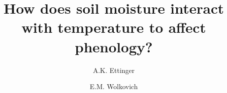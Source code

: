 \documentclass{article}
\begin{document}


\title{How does soil moisture interact with temperature to affect phenology?}
\author[1,2,a]{A.K. Ettinger}









\author[1,8,13,j]{E.M. Wolkovich}












\end{document}
